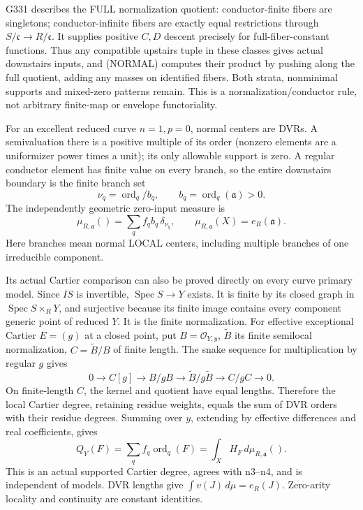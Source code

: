 G331 describes the FULL normalization quotient: conductor-finite fibers are singletons; conductor-infinite fibers are exactly equal restrictions through \(S/\mathfrak c\to R/\mathfrak c\). It supplies positive \(C,D\) descent precisely for full-fiber-constant functions. Thus any compatible upstairs tuple in these classes gives actual downstairs inputs, and (NORMAL) computes their product by pushing along the full quotient, adding any masses on identified fibers. Both strata, nonminimal supports and mixed-zero patterns remain. This is a normalization/conductor rule, not arbitrary finite-map or envelope functoriality.

For an excellent reduced curve \(n=1,p=0\), normal centers are DVRs. A semivaluation there is a positive multiple of its order (nonzero elements are a uniformizer power times a unit); its only allowable support is zero. A regular conductor element has finite value on every branch, so the entire downstairs boundary is the finite branch set
\[
\nu_q=\operatorname{ord}_q/b_q,\qquad b_q=\operatorname{ord}_q(\mathfrak a)>0.
\]
The independently geometric zero-input measure is
\[
\mu_{R,\mathfrak a}()=\sum_q f_qb_q\,\delta_{\nu_q},\qquad
\mu_{R,\mathfrak a}(X)=e_R(\mathfrak a). \tag{CURVE}
\]
Here branches mean normal LOCAL centers, including multiple branches of one irreducible component.

Its actual Cartier comparison can also be proved directly on every curve primary model. Since \(IS\) is invertible, \(\operatorname{Spec}S\to Y\) exists. It is finite by its closed graph in \(\operatorname{Spec}S\times_RY\), and surjective because its finite image contains every component generic point of reduced \(Y\). It is the finite normalization. For effective exceptional Cartier \(E=(g)\) at a closed point, put \(B=\mathcal O_{Y,y}\), \(\widetilde B\) its finite semilocal normalization, \(C=\widetilde B/B\) of finite length. The snake sequence for multiplication by regular \(g\) gives
\[
0\to C[g]\to B/gB\to\widetilde B/g\widetilde B\to C/gC\to0.
\]
On finite-length \(C\), the kernel and quotient have equal lengths. Therefore the local Cartier degree, retaining residue weights, equals the sum of DVR orders with their residue degrees. Summing over \(y\), extending by effective differences and real coefficients, gives
\[
Q_Y(F)=\sum_q f_q\operatorname{ord}_q(F)
=\int_X H_F\,d\mu_{R,\mathfrak a}().
\]
This is an actual supported Cartier degree, agrees with n3--n4, and is independent of models. DVR lengths give \(\int v(J)\,d\mu=e_R(J)\). Zero-arity locality and continuity are constant identities.

